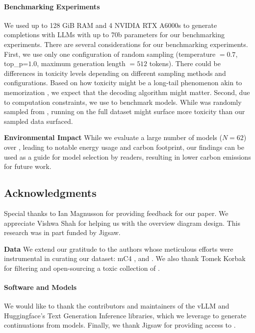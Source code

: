\paragraph{Benchmarking Experiments} We used up to 128 GiB RAM and 4 NVIDIA RTX A6000s to generate completions with LLMs with up to 70b parameters for our benchmarking experiments. There are several considerations for our benchmarking experiments. First, we use only one configuration of random sampling (temperature $=0.7$, top\_p=$1.0$, maximum generation length $=512$ tokens). There could be differences in toxicity levels depending on different sampling methods and configurations. Based on how toxicity might be a long-tail phenomenon akin to memorization \citep{tirumala2022memorization}, we expect that the decoding algorithm might matter. Second, due to computation constraints, we use \datasetSmall to benchmark models. While \datasetSmall was randomly sampled from \datasetName, running on the full dataset might surface more toxicity than our sampled data surfaced. 

\textbf{Environmental Impact} While we evaluate a large number of models ($N = 62$) over \datasetSmall, leading to notable energy usage and carbon footprint, our findings can be used as a guide for model selection by readers, resulting in lower carbon emissions for future work.

\subsection*{\textbf{Acknowledgments}}

Special thanks to Ian Magnusson for providing feedback for our paper. We appreciate Vishwa Shah for helping us with the overview diagram design. This research was in part funded by Jigsaw.

\textbf{Data} We extend our gratitude to the authors whose meticulous efforts were instrumental in curating our dataset: mC4 \citep{xue-etal-2021-mt5}, and \thepile \citep{gao2020pile}. We also thank Tomek Korbak for filtering and open-sourcing a toxic collection of \thepile.

\paragraph{Software and Models} We would like to thank the contributors and maintainers of the vLLM \citep{kwon2023efficient} and Huggingface's Text Generation Inference libraries, which we leverage to generate continuations from models. Finally, we thank Jigsaw for providing access to \perspectiveAPI.

\newpage

